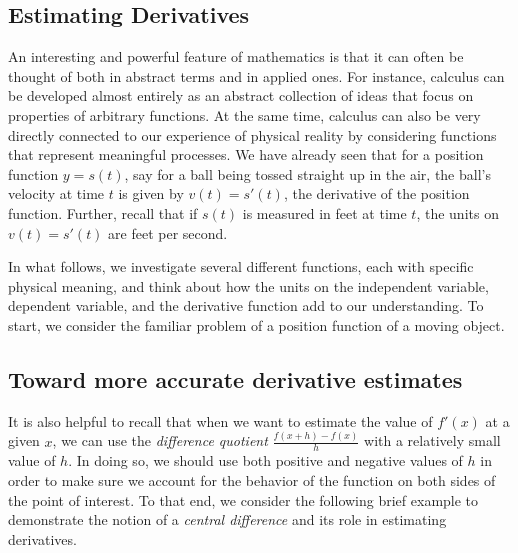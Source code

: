 \subsection*{Estimating Derivatives}

An interesting and powerful feature of mathematics is that it can often be thought of both in abstract terms and in applied ones.  For instance, calculus can be developed almost entirely as an abstract collection of ideas that focus on properties of arbitrary functions.  At the same time, calculus can also be very directly connected to our experience of physical reality by considering functions that represent meaningful processes.  We have already seen that for a position function $y = s(t)$, say for a ball being tossed straight up in the air, the ball's velocity at time $t$ is given by $v(t) = s'(t)$, the derivative of the position function.  Further, recall that if $s(t)$ is measured in feet at time $t$, the units on $v(t) = s'(t)$ are feet per second.

In what follows, we investigate several different functions, each with specific physical meaning, and think about how the units on the independent variable, dependent variable, and the derivative function add to our understanding.  To start, we consider the familiar problem of a position function of a moving object.


\subsection*{Toward more accurate derivative estimates}

It is also helpful to recall that when we want to estimate the value of $f'(x)$ at a given $x$, we can use the \emph{difference quotient}  $\frac{f(x+h)-f(x)}{h}$ with a relatively small value of $h$.  In doing so, we should use both positive and negative values of $h$ in order to make sure we account for the behavior of the function on both sides of the point of interest.  To that end, we consider the following brief example to demonstrate the notion of a \emph{central difference} and its role in estimating derivatives.

